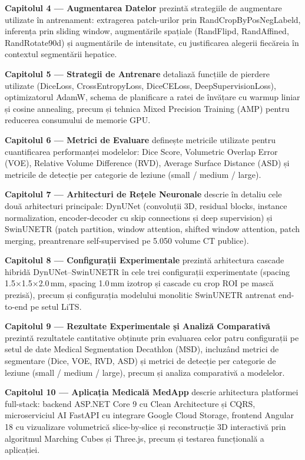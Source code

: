 \documentclass[12pt, a4paper]{report}
\begin{document}
\textbf{Capitolul 4 — Augmentarea Datelor} prezintă strategiile
de augmentare utilizate în antrenament: extragerea patch-urilor
prin RandCropByPosNegLabeld, inferența prin sliding window,
augmentările spațiale (RandFlipd, RandAffined, RandRotate90d)
și augmentările de intensitate, cu justificarea alegerii fiecăreia
în contextul segmentării hepatice.

\textbf{Capitolul 5 — Strategii de Antrenare} detaliază funcțiile
de pierdere utilizate (DiceLoss, CrossEntropyLoss, DiceCELoss,
DeepSupervisionLoss), optimizatorul AdamW, schema de planificare
a ratei de învățare cu warmup liniar și cosine annealing, precum
și tehnica Mixed Precision Training (AMP) pentru reducerea
consumului de memorie GPU.

\textbf{Capitolul 6 — Metrici de Evaluare} definește metricile
utilizate pentru cuantificarea performanței modelelor: Dice Score,
Volumetric Overlap Error (VOE), Relative Volume Difference (RVD),
Average Surface Distance (ASD) și metricile de detecție per
categorie de leziune (small / medium / large).

\textbf{Capitolul 7 — Arhitecturi de Rețele Neuronale} descrie
în detaliu cele două arhitecturi principale: DynUNet (convoluții
3D, residual blocks, instance normalization, encoder-decoder cu
skip connections și deep supervision) și SwinUNETR (patch
partition, window attention, shifted window attention, patch
merging, preantrenare self-supervised pe 5.050 volume CT publice).

\textbf{Capitolul 8 — Configurații Experimentale} prezintă
arhitectura cascade hibridă DynUNet–SwinUNETR în cele trei
configurații experimentate (spacing 1.5$\times$1.5$\times$2.0\,mm,
spacing 1.0\,mm izotrop și cascade cu crop ROI pe mască prezisă),
precum și configurația modelului monolitic SwinUNETR antrenat
end-to-end pe setul LiTS.

\textbf{Capitolul 9 — Rezultate Experimentale și Analiză Comparativă} prezintă
rezultatele cantitative obținute prin evaluarea celor patru configurații
pe setul de date Medical Segmentation Decathlon (MSD), incluzând metrici
de segmentare (Dice, VOE, RVD, ASD) și metrici de detecție per categorie
de leziune (small / medium / large), precum și analiza comparativă
a modelelor.


\textbf{Capitolul 10 — Aplicația Medicală MedApp} descrie
arhitectura platformei full-stack: backend ASP.NET Core 9 cu
Clean Architecture și CQRS, microserviciul AI FastAPI cu
integrare Google Cloud Storage, frontend Angular 18 cu
vizualizare volumetrică slice-by-slice și reconstrucție 3D
interactivă prin algoritmul Marching Cubes și Three.js,
precum și testarea funcțională a aplicației.
\end{document}
